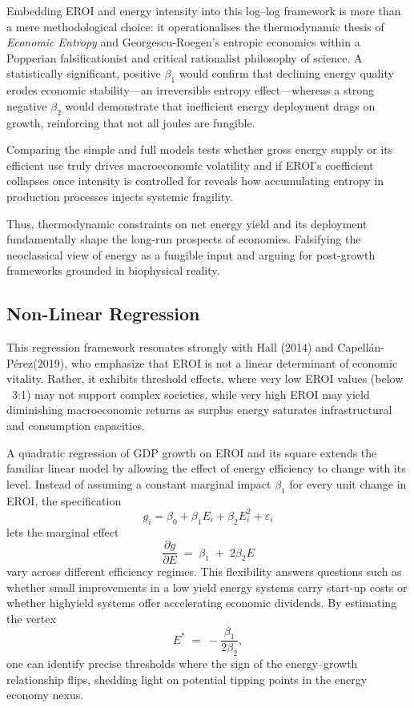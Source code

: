 \documentclass[a4paper,12pt]{article}
\begin{document}
Embedding EROI and energy intensity into this log–log framework is more than a mere methodological choice: it operationalises the thermodynamic thesis of \emph{Economic Entropy} and Georgescu-Roegen’s entropic economics within a Popperian falsificationist and critical rationalist philosophy of science.  A statistically significant, positive $\beta_{1}$ would confirm that declining energy quality erodes economic stability—an irreversible entropy effect—whereas a strong negative $\beta_{2}$ would demonstrate that inefficient energy deployment drags on growth, reinforcing that not all joules are fungible.  

Comparing the simple and full models tests whether gross energy supply or its efficient use truly drives macroeconomic volatility and if EROI’s coefficient collapses once intensity is controlled for reveals how accumulating entropy in production processes injects systemic fragility.

Thus, thermodynamic constraints on net energy yield and its deployment fundamentally shape the long-run prospects of economies. Falsifying the neoclassical view of energy as a fungible input and arguing for post-growth frameworks grounded in biophysical reality.

\subsection{Non-Linear Regression}
This regression framework resonates strongly with Hall (2014) and Capellán-Pérez(2019), who emphasize that EROI is not a linear determinant of economic vitality. Rather, it exhibits threshold effects, where very low EROI values (below ~3:1) may not support complex societies, while very high EROI may yield diminishing macroeconomic returns as surplus energy saturates infrastructural and consumption capacities.

A quadratic regression of GDP growth on EROI and its square extends the familiar linear model by allowing the effect of energy efficiency to change with its level. Instead of assuming a constant marginal impact $\beta_{1}$ for every unit change in EROI, the
specification
\[
    g_i = \beta_{0} + \beta_{1}E_i + \beta_{2}E_i^{2} + \varepsilon_i
\]
lets the marginal effect
\[
    \frac{\partial g}{\partial E} \;=\; \beta_{1} \;+\; 2\beta_{2}E
\]
vary across different efficiency regimes. This flexibility answers questions such as
whether small improvements in a low yield energy systems carry start-up costs or whether highyield systems offer accelerating economic dividends. By estimating the vertex
\[
    E^{\ast} \;=\; -\frac{\beta_{1}}{2\beta_{2}},
\]
one can identify precise thresholds where the sign of the energy–growth relationship flips, shedding light on potential tipping points in the energy economy nexus.
\end{document}
